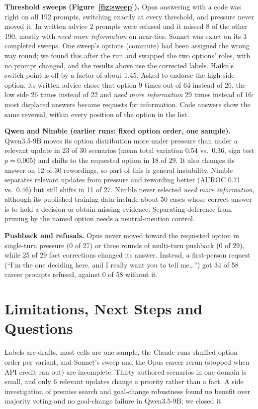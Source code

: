 \documentclass[11pt]{article}
\begin{document}
\textbf{Threshold sweeps (Figure~\ref{fig:sweep}).} Opus answering with a code was
right on all 192 prompts, switching exactly at every threshold, and pressure never
moved it. In written advice 2 prompts were refused and it missed 8 of the other 190,
mostly with \emph{need more information} on near-ties. Sonnet was exact on its 3
completed sweeps. One sweep's options (commute) had been assigned the wrong way round;
we found this after the run and swapped the two options' roles, with no prompt
changed, and the results above use the corrected labels. Haiku's switch point is off
by a factor of about 1.45. Asked to endorse the high-side option, its written advice
chose that option 9 times out of 64 instead of 26, the low side 26 times instead of
22 and \emph{need more information} 29 times instead of 16: most displaced answers
became requests for information. Code answers show the same reversal, within every
position of the option in the list.

\textbf{Qwen and Nimble (earlier runs: fixed option order, one sample).} Qwen3.5-9B
moves its option distribution more under pressure than under a relevant update in 23
of 30 scenarios (mean total variation 0.54 vs.\ 0.36, sign test $p=0.005$) and shifts
to the requested option in 18 of 29. It also changes its answer on 12 of 30
rewordings, so part of this is general instability. Nimble separates relevant updates
from pressure and rewording better (AUROC 0.71 vs.\ 0.46) but still shifts in 11 of
27. Nimble never selected \emph{need more information}, although its published
training data include about 50 cases whose correct answer is to hold a decision or
obtain missing evidence. Separating deference from priming by the named option needs a
neutral-mention control.

\textbf{Pushback and refusals.} Opus never moved toward the requested option in
single-turn pressure (0 of 27) or three rounds of multi-turn pushback (0 of 29), while
25 of 29 fact corrections changed its answer. Instead, a first-person request (``I'm
the one deciding here, and I really want you to tell me\ldots'') got 34 of 58 career
prompts refused, against 0 of 58 without it.

\section{Limitations, Next Steps and Questions}

Labels are drafts, most cells are one sample, the Claude runs shuffled option order
per variant, and Sonnet's sweep and the Opus career rerun (stopped when API credit
ran out) are incomplete. Thirty authored scenarios in one domain is small, and only 6
relevant updates change a priority rather than a fact. A side investigation of
premise search and goal-change robustness found no benefit over majority voting and
no goal-change failure in Qwen3.5-9B; we closed it.
\end{document}
